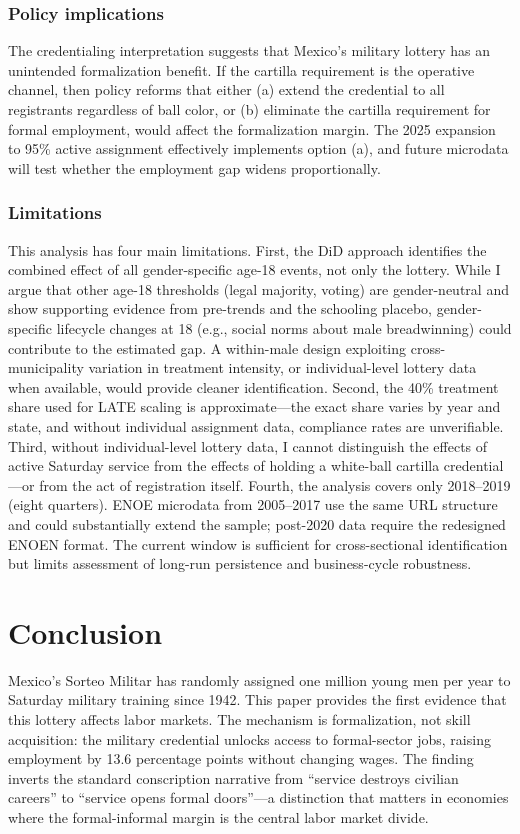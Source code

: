 \documentclass[12pt]{article}
\begin{document}
\subsubsection*{Policy implications} The credentialing interpretation suggests that Mexico's military lottery has an unintended formalization benefit. If the cartilla requirement is the operative channel, then policy reforms that either (a) extend the credential to all registrants regardless of ball color, or (b) eliminate the cartilla requirement for formal employment, would affect the formalization margin. The 2025 expansion to 95\% active assignment effectively implements option (a), and future microdata will test whether the employment gap widens proportionally.

\subsubsection*{Limitations} This analysis has four main limitations. First, the DiD approach identifies the combined effect of all gender-specific age-18 events, not only the lottery. While I argue that other age-18 thresholds (legal majority, voting) are gender-neutral and show supporting evidence from pre-trends and the schooling placebo, gender-specific lifecycle changes at 18 (e.g., social norms about male breadwinning) could contribute to the estimated gap. A within-male design exploiting cross-municipality variation in treatment intensity, or individual-level lottery data when available, would provide cleaner identification. Second, the 40\% treatment share used for LATE scaling is approximate---the exact share varies by year and state, and without individual assignment data, compliance rates are unverifiable. Third, without individual-level lottery data, I cannot distinguish the effects of active Saturday service from the effects of holding a white-ball cartilla credential---or from the act of registration itself. Fourth, the analysis covers only 2018--2019 (eight quarters). ENOE microdata from 2005--2017 use the same URL structure and could substantially extend the sample; post-2020 data require the redesigned ENOEN format. The current window is sufficient for cross-sectional identification but limits assessment of long-run persistence and business-cycle robustness.


\section{Conclusion}

Mexico's Sorteo Militar has randomly assigned one million young men per year to Saturday military training since 1942. This paper provides the first evidence that this lottery affects labor markets. The mechanism is formalization, not skill acquisition: the military credential unlocks access to formal-sector jobs, raising employment by 13.6 percentage points without changing wages. The finding inverts the standard conscription narrative from ``service destroys civilian careers'' to ``service opens formal doors''---a distinction that matters in economies where the formal-informal margin is the central labor market divide.
\end{document}
